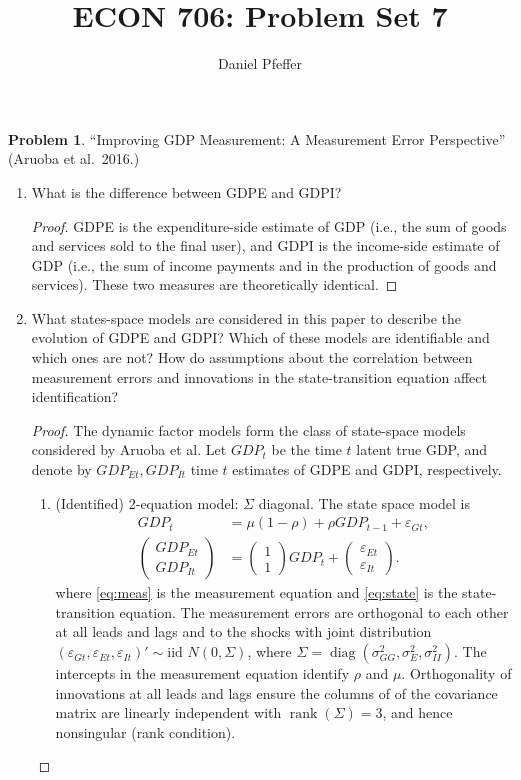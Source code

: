 \documentclass[oneside,reqno]{amsart}
\title{ECON 706: Problem Set 7}
\author{Daniel Pfeffer}
\DeclareMathOperator{\diag}{diag}
\DeclareMathOperator{\rank}{rank}
\newcommand{\eps}{\varepsilon}
\theoremstyle{definition}
\newtheorem{prob}{Problem}
\begin{document}
\maketitle

\begin{prob}
``Improving GDP Measurement: A Measurement Error Perspective'' (Aruoba et al.\ 2016.)
\end{prob}

\begin{enumerate}[label=(\roman*)]
\item
What is the difference between GDPE and GDPI?
\begin{proof}
GDPE is the expenditure-side estimate of GDP  (i.e., the sum of goods and services sold to the final user), and GDPI is the income-side estimate of GDP (i.e., the sum of income payments and  in the production of goods and services). These two measures are theoretically identical.
\end{proof}
\item
What states-space models are considered in this paper to describe the
evolution of GDPE and GDPI? Which of these models are identifiable and which ones are not? How do assumptions about the correlation between measurement errors and innovations in the state-transition equation affect identification?
\begin{proof}
The dynamic factor models form the class of state-space models considered by Aruoba et al. Let $GDP_t$ be the time $t$ latent true GDP, and denote by $GDP_{Et}, GDP_{It}$ time $t$ estimates of GDPE and GDPI, respectively.  
\leavevmode
\begin{enumerate}[label=(\arabic*)]
\item
(Identified) 2-equation model: $\Sigma$ diagonal. The state space model is 
\begin{align}
	GDP_t &= \mu(1-\rho) + \rho GDP_{t-1} + \eps_{Gt}, \label{eq:state} \\
	\begin{pmatrix}
		GDP_{Et}  \\ GDP_{It}
	\end{pmatrix} 
	&= \begin{pmatrix}
		1 \\ 1
	\end{pmatrix} GDP_t
	+ \begin{pmatrix}
		\eps_{Et} \\ \eps_{It}
	\end{pmatrix}  \label{eq:meas}.
\end{align}
where \eqref{eq:meas} is the measurement equation and \eqref{eq:state} is the state-transition equation. The measurement errors are orthogonal to each other at all leads and lags and to the shocks with joint distribution $(\eps_{Gt}, \eps_{Et}, \eps_{It})' \sim \text{iid } N(0, \Sigma)$, where $\Sigma = \diag(\sigma_{GG}^2, \sigma_E^2, \sigma_{II}^2)$. The intercepts in the measurement equation identify $\rho$ and $\mu$. Orthogonality of innovations at all leads and lags ensure the columns of of the covariance matrix are linearly independent with $\rank(\Sigma) = 3$, and hence nonsingular (rank condition).

\end{enumerate}
\end{proof}
\end{enumerate}
\end{document}
